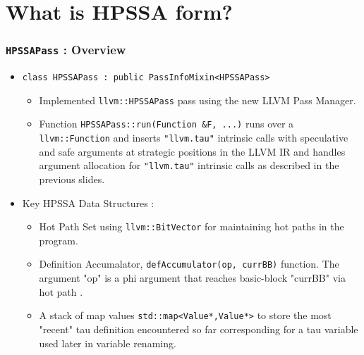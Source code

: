 \documentclass{beamer}
\begin{document}
\section{What is HPSSA form?}
\footnotesize
\begin{frame}
	\frametitle{\texttt{HPSSAPass} : Overview}
	\begin{itemize}
		\item \texttt{class HPSSAPass : public PassInfoMixin<HPSSAPass>}
		\begin{itemize}
			\footnotesize
			\item Implemented \texttt{llvm::HPSSAPass} pass using the new LLVM Pass Manager. 
			\item Function \texttt{HPSSAPass::run(Function \&F, ...)}  runs over a \texttt{llvm::Function} and inserts \texttt{"llvm.tau"} intrinsic calls with speculative and safe arguments at strategic positions in the LLVM IR and handles argument allocation for  \texttt{"llvm.tau"} intrinsic calls as described in the previous slides.
		\end{itemize}
		\item Key HPSSA Data Structures :  
		\begin{itemize}
			\footnotesize
			\item Hot Path Set using \texttt{llvm::BitVector} for maintaining \color{red} hot paths \color{black} in the program.
			\item Definition Accumalator, \texttt{defAccumulator(op, currBB)} function. %
			The argument "op" is a phi argument that reaches basic-block "currBB" via \color{red} hot path \color{black}. 
			\item A stack of map values \texttt{std::map<Value*,Value*>} to store the most "recent" tau definition encountered so far corresponding for a tau variable used later in variable renaming. 
		\end{itemize}
	\end{itemize}
\end{frame}
\end{document}
